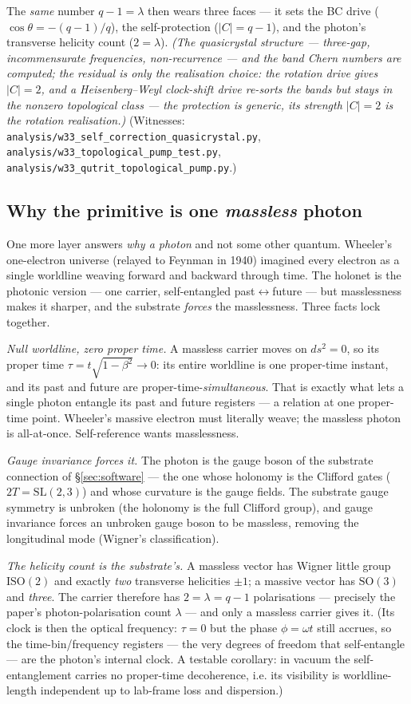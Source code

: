\documentclass[11pt]{article}
\begin{document}
The \emph{same} number $q-1=\lambda$ then wears three faces --- it sets the BC
drive ($\cos\theta=-(q-1)/q$), the self-protection ($|C|=q-1$), and the photon's
transverse helicity count ($2=\lambda$). \emph{(The
quasicrystal structure --- three-gap, incommensurate frequencies, non-recurrence
--- and the band Chern numbers are computed; the residual is only the realisation
choice: the rotation drive gives $|C|=2$, and a Heisenberg--Weyl clock-shift
drive re-sorts the bands but stays in the nonzero topological class --- the
protection is generic, its strength $|C|=2$ is the rotation realisation.)}
(Witnesses: \texttt{analysis/w33\_self\_correction\_quasicrystal.py},
\texttt{analysis/w33\_topological\_pump\_test.py},
\texttt{analysis/w33\_qutrit\_topological\_pump.py}.)

\subsection{Why the primitive is one \emph{massless} photon}

One more layer answers \emph{why a photon} and not some other quantum. Wheeler's
one-electron universe (relayed to Feynman in 1940) imagined every electron as a
single worldline weaving forward and backward through time. The holonet is the
photonic version --- one carrier, self-entangled past$\leftrightarrow$future ---
but masslessness makes it sharper, and the substrate \emph{forces} the
masslessness. Three facts lock together.

\emph{Null worldline, zero proper time.} A massless carrier moves on $ds^2=0$, so
its proper time $\tau=t\sqrt{1-\beta^2}\to 0$: its entire worldline is one
proper-time instant, and its past and future are proper-time-\emph{simultaneous}.
That is exactly what lets a single photon entangle its past and future registers
--- a relation at one proper-time point. Wheeler's massive electron must
literally weave; the massless photon is all-at-once. Self-reference wants
masslessness.

\emph{Gauge invariance forces it.} The photon is the gauge boson of the substrate
connection of \S\ref{sec:software} --- the one whose holonomy is the Clifford
gates ($2T=\mathrm{SL}(2,3)$) and whose curvature is the gauge fields. The
substrate gauge symmetry is unbroken (the holonomy is the full Clifford group),
and gauge invariance forces an unbroken gauge boson to be massless, removing the
longitudinal mode (Wigner's classification).

\emph{The helicity count is the substrate's.} A massless vector has Wigner little
group $\mathrm{ISO}(2)$ and exactly \emph{two} transverse helicities $\pm1$; a
massive vector has $\mathrm{SO}(3)$ and \emph{three}. The carrier therefore has
$2=\lambda=q-1$ polarisations --- precisely the paper's photon-polarisation
count $\lambda$ --- and only a massless carrier gives it. (Its clock is then the
optical frequency: $\tau=0$ but the phase $\phi=\omega t$ still accrues, so the
time-bin/frequency registers --- the very degrees of freedom that self-entangle
--- are the photon's internal clock. A testable corollary: in vacuum the
self-entanglement carries no proper-time decoherence, i.e. its visibility is
worldline-length independent up to lab-frame loss and dispersion.)
\end{document}
